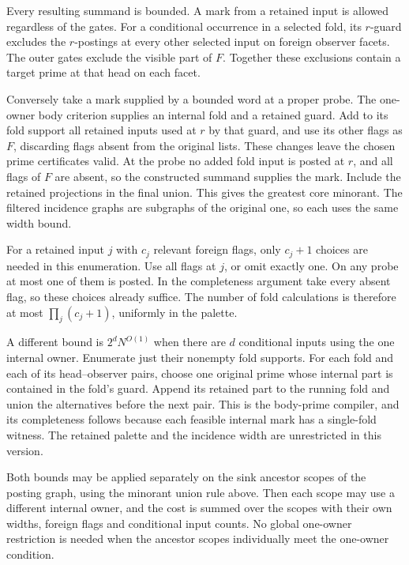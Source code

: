 Every resulting summand is bounded. A mark
from a retained input is allowed regardless
of the gates. For a conditional occurrence
in a selected fold, its $r$-guard excludes
the $r$-postings at every other selected
input on foreign observer facets. The outer
gates exclude the visible part of $F$.
Together these exclusions contain a target
prime at that head on each facet.

Conversely take a mark supplied by a bounded
word at a proper probe. The one-owner body
criterion supplies an internal fold and a
retained guard. Add to its fold support all
retained inputs used at $r$ by that guard,
and use its other flags as $F$, discarding
flags absent from the original lists.
These changes leave the chosen prime
certificates valid. At the probe no added
fold input is posted at $r$, and all flags
of $F$ are absent, so the constructed
summand supplies the mark. Include the
retained projections in the final union.
This gives the greatest core minorant.
The filtered incidence graphs are
subgraphs of the original one, so each
uses the same width bound.

For a retained input $j$ with $c_j$ relevant
foreign flags, only $c_j+1$ choices are
needed in this enumeration. Use all flags
at $j$, or omit exactly one. On any probe
at most one of them is posted. In the
completeness argument take every absent
flag, so these choices already suffice.
The number of fold calculations is therefore
at most $\prod_j(c_j+1)$, uniformly in the
palette.

A different bound is $2^dN^{O(1)}$ when
there are $d$ conditional inputs using the
one internal owner. Enumerate just their
nonempty fold supports. For each fold and
each of its head--observer pairs, choose
one original prime whose internal part is
contained in the fold's guard. Append its
retained part to the running fold and union
the alternatives before the next pair.
This is the body-prime compiler, and its
completeness follows because each feasible
internal mark has a single-fold witness.
The retained palette and the incidence
width are unrestricted in this version.

Both bounds may be applied separately on
the sink ancestor scopes of the posting
graph, using the minorant union rule above.
Then each scope may use a different
internal owner, and the cost is summed over
the scopes with their own widths, foreign
flags and conditional input counts. No
global one-owner restriction is needed when
the ancestor scopes individually meet the
one-owner condition.

